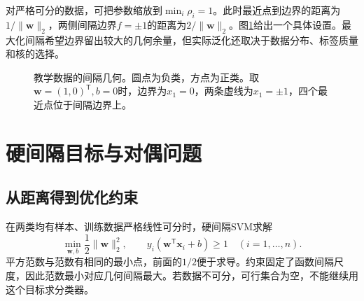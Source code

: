 对严格可分的数据，可把参数缩放到$\min_i\rho_i=1$。此时最近点到边界的距离为$1/\|\bm w\|_2$，两侧间隔边界$f=\pm1$的距离为$2/\|\bm w\|_2$。图\ref{fig:svm-margin-geometry}给出一个具体设置。最大化间隔希望边界留出较大的几何余量，但实际泛化还取决于数据分布、标签质量和核的选择。

\begin{figure}[htbp]
\centering
{}
\caption{教学数据的间隔几何。圆点为负类，方点为正类。取$\bm w=(1,0)^{\mathsf T},b=0$时，边界为$x_1=0$，两条虚线为$x_1=\pm1$，四个最近点位于间隔边界上。}
\label{fig:svm-margin-geometry}
\end{figure}

\section{硬间隔目标与对偶问题}
\subsection{从距离得到优化约束}
在两类均有样本、训练数据严格线性可分时，硬间隔SVM求解
\begin{equation}
 \min_{\bm w,b}\frac12\|\bm w\|_2^2,
 \qquad y_i(\bm w^{\mathsf T}\bm x_i+b)\ge1\quad(i=1,\ldots,n).
 \label{eq:svm-hard-margin-primal}
\end{equation}
平方范数与范数有相同的最小点，前面的$1/2$便于求导。约束固定了函数间隔尺度，因此范数最小对应几何间隔最大。若数据不可分，可行集合为空，不能继续用这个目标求分类器。

